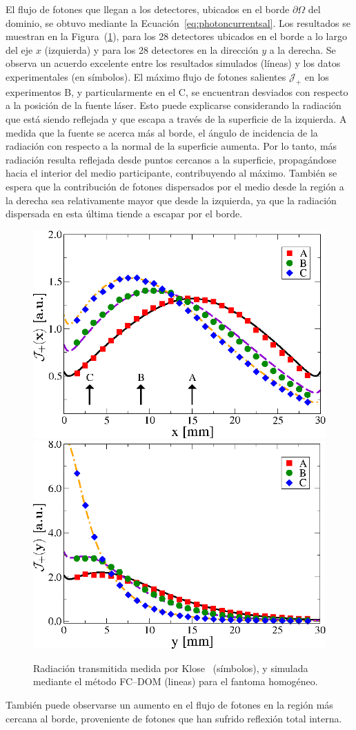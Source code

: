 El flujo de fotones que llegan a los detectores, ubicados en el borde $\partial \Omega$ 
del dominio, se obtuvo mediante la Ecuación~\eqref{eq:photoncurrentsal}. 
Los resultados se muestran en la Figura~(\ref{fig:fluxph1}), 
para los 28 detectores ubicados en el borde a lo largo del eje $x$ (izquierda) 
y para los 28 detectores en la dirección $y$ a la derecha. 
Se observa un acuerdo excelente entre los resultados simulados (líneas) 
y los datos experimentales (en símbolos).  El máximo 
flujo de fotones salientes $\mathcal{J}_+$ en los experimentos B, 
y particularmente en el C, se encuentran desviados con respecto a la posición 
de la fuente láser. Esto puede explicarse considerando la radiación 
que está siendo reflejada y que escapa a través de la superficie de la izquierda. 
A medida que la fuente se acerca más al borde, el ángulo de incidencia de la 
radiación con respecto a la normal de la superficie aumenta. Por lo tanto, 
más radiación resulta reflejada desde puntos cercanos a la superficie, 
propagándose hacia el interior del medio participante, 
contribuyendo al máximo. También se espera que la contribución de fotones dispersados 
por el medio desde la región a la derecha sea relativamente mayor 
que desde la izquierda, ya que la radiación 
dispersada en esta última tiende a escapar por el borde. 
\begin{figure}[h!]
\centering
  \includegraphics[width=0.48\linewidth]{figuras/kloseph1x.eps}
  \includegraphics[width=0.48\linewidth]{figuras/ph1y.eps}
  \caption{Radiación transmitida medida por Klose~\cite{Klose2002} (símbolos), 
  y simulada mediante el método FC--DOM (lineas) para el fantoma homogéneo. }
 \label{fig:fluxph1}
\end{figure}
También puede observarse un aumento en el flujo de fotones en la región más 
cercana al borde, proveniente de fotones que han sufrido reflexión total interna.

